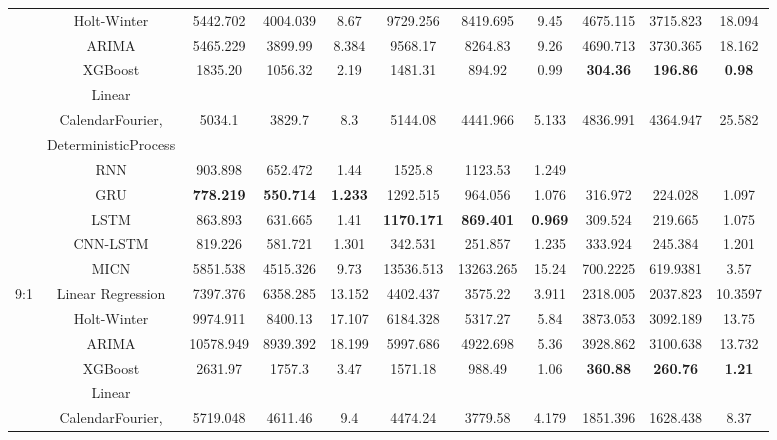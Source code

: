 \documentclass[conference]{IEEEtran}
\begin{document}
\begin{table}[t]
\begin{tabular}{lcccccccccc}
                    & Holt-Winter & 5442.702 & 4004.039 & 8.67 & 9729.256 & 8419.695 & 9.45 & 4675.115 & 3715.823 & 18.094\\
                    & ARIMA & 5465.229 & 3899.99 & 8.384 & 9568.17 & 8264.83 & 9.26 & 4690.713 & 3730.365 & 18.162\\
                    & XGBoost & 1835.20 & 1056.32 & 2.19 & 1481.31 & 894.92 & 0.99 & \textbf{304.36} & \textbf{196.86} & \textbf{0.98}\\
                    & Linear  \\
                    & CalendarFourier, & 5034.1 & 3829.7 & 8.3 & 5144.08 & 4441.966 & 5.133 & 4836.991 & 4364.947 & 25.582\\
                    & DeterministicProcess & & & \\
                    & RNN & 903.898 & 652.472 & 1.44 & 1525.8 & 1123.53 & 1.249 \\
                    & GRU & \textbf{778.219} & \textbf{550.714} & \textbf{1.233} & 1292.515 & 964.056 & 1.076 & 316.972 & 224.028 & 1.097\\
                    & LSTM & 863.893 & 631.665 & 1.41 & \textbf{1170.171} & \textbf{869.401} & \textbf{0.969} & 309.524 & 219.665 & 1.075\\
                    & CNN-LSTM & 819.226 & 581.721 & 1.301 & 342.531 & 251.857 & 1.235 & 333.924 & 245.384 & 1.201\\
                    & MICN & 5851.538 & 4515.326 & 9.73 & 13536.513 & 13263.265 & 15.24 & 700.2225 & 619.9381 & 3.57\\
                    \midrule
\multirow{10}{*}{9:1} 
                    & Linear Regression & 7397.376 & 6358.285 & 13.152 & 4402.437 & 3575.22 & 3.911 & 2318.005 & 2037.823 & 10.3597\\
                    & Holt-Winter & 9974.911 & 8400.13 & 17.107 & 6184.328 & 5317.27 & 5.84 & 3873.053 & 3092.189 & 13.75 \\
                    & ARIMA & 10578.949 & 8939.392 & 18.199 & 5997.686 & 4922.698 & 5.36 & 3928.862 & 3100.638 & 13.732\\
                    & XGBoost & 2631.97 & 1757.3 & 3.47  & 1571.18 & 988.49 & 1.06 & \textbf{360.88} & \textbf{260.76} & \textbf{1.21}\\
                    & Linear & & & \\
                    & CalendarFourier, & 5719.048 & 4611.46 & 9.4 & 4474.24 & 3779.58 &4.179 & 1851.396 & 1628.438 & 8.37\\

\end{tabular}
\end{table}
\end{document}
